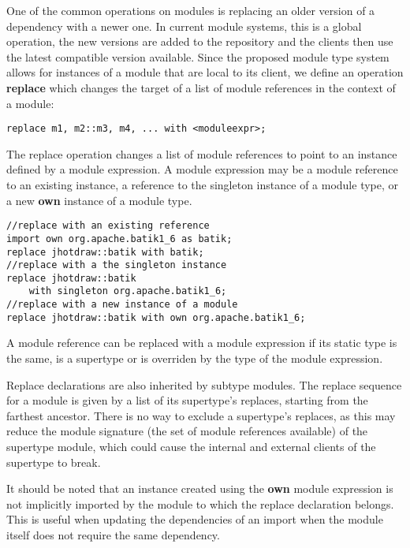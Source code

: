 
One of the common operations on modules is replacing an older version of a
dependency with a newer one. In current module systems, this is a global operation,
the new versions are added to the repository and the clients then use the latest
compatible version available. Since the proposed module type system allows for instances
of a module that are local to its client, we define an operation \textbf{replace} which
changes the target of a list of module references in the context of a module:

\begin{lstlisting}
replace m1, m2::m3, m4, ... with <moduleexpr>;
\end{lstlisting}

The replace operation changes a list of module references to point to an instance
defined by a module expression. A module expression may be a module reference to
an existing instance, a reference to the singleton instance of a module type, or
a new \textbf{own} instance of a module type.

\begin{lstlisting}[caption=Module Expressions for Replace]
//replace with an existing reference
import own org.apache.batik1_6 as batik;
replace jhotdraw::batik with batik;
//replace with a the singleton instance
replace jhotdraw::batik 
	with singleton org.apache.batik1_6;
//replace with a new instance of a module
replace jhotdraw::batik with own org.apache.batik1_6;
\end{lstlisting}

A module reference can be replaced with a module expression if its static type
is the same, is a supertype or is overriden by the type of the module expression.

Replace declarations are also inherited by subtype modules. The replace sequence for a
module is given by a list of its supertype's replaces, starting from the farthest
ancestor. There is no way to exclude a supertype's replaces, as
this may reduce the module signature (the set of module references available) of
the supertype module, which could cause the internal and external clients of
the supertype to break.

It should be noted that an instance created using the \textbf{own} module expression is not
implicitly imported by the module to which the replace declaration belongs. This
is useful when updating the dependencies of an import when the module itself
does not require the same dependency.

